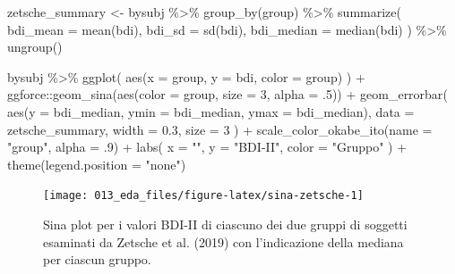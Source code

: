 \documentclass[
  10pt,
  italian,
  a4paper,
  extrafontsizes,onecolumn,openright
  ]{memoir}
\newenvironment{Shaded}{\begin{snugshade}}{\end{snugshade}}
\newcommand{\AttributeTok}[1]{\textcolor[rgb]{0.77,0.63,0.00}{#1}}
\newcommand{\DecValTok}[1]{\textcolor[rgb]{0.00,0.00,0.81}{#1}}
\newcommand{\FloatTok}[1]{\textcolor[rgb]{0.00,0.00,0.81}{#1}}
\newcommand{\FunctionTok}[1]{\textcolor[rgb]{0.00,0.00,0.00}{#1}}
\newcommand{\NormalTok}[1]{#1}
\newcommand{\OtherTok}[1]{\textcolor[rgb]{0.56,0.35,0.01}{#1}}
\newcommand{\SpecialCharTok}[1]{\textcolor[rgb]{0.00,0.00,0.00}{#1}}
\newcommand{\StringTok}[1]{\textcolor[rgb]{0.31,0.60,0.02}{#1}}
\theoremstyle{definition}
\theoremstyle{definition}
\theoremstyle{definition}
\theoremstyle{definition}
\theoremstyle{remark}
\begin{document}
\begin{Shaded}
\begin{Highlighting}[]
\NormalTok{zetsche\_summary }\OtherTok{\textless{}{-}}\NormalTok{ bysubj }\SpecialCharTok{\%\textgreater{}\%}
  \FunctionTok{group\_by}\NormalTok{(group) }\SpecialCharTok{\%\textgreater{}\%}
  \FunctionTok{summarize}\NormalTok{(}
    \AttributeTok{bdi\_mean =} \FunctionTok{mean}\NormalTok{(bdi),}
    \AttributeTok{bdi\_sd =} \FunctionTok{sd}\NormalTok{(bdi),}
    \AttributeTok{bdi\_median =} \FunctionTok{median}\NormalTok{(bdi)}
\NormalTok{  ) }\SpecialCharTok{\%\textgreater{}\%} 
  \FunctionTok{ungroup}\NormalTok{()}

\NormalTok{bysubj }\SpecialCharTok{\%\textgreater{}\%}
  \FunctionTok{ggplot}\NormalTok{(}
    \FunctionTok{aes}\NormalTok{(}\AttributeTok{x =}\NormalTok{ group, }\AttributeTok{y =}\NormalTok{ bdi, }\AttributeTok{color =}\NormalTok{ group)}
\NormalTok{  ) }\SpecialCharTok{+}
\NormalTok{  ggforce}\SpecialCharTok{::}\FunctionTok{geom\_sina}\NormalTok{(}\FunctionTok{aes}\NormalTok{(}\AttributeTok{color =}\NormalTok{ group, }\AttributeTok{size =} \DecValTok{3}\NormalTok{, }\AttributeTok{alpha =}\NormalTok{ .}\DecValTok{5}\NormalTok{)) }\SpecialCharTok{+}
  \FunctionTok{geom\_errorbar}\NormalTok{(}
    \FunctionTok{aes}\NormalTok{(}\AttributeTok{y =}\NormalTok{ bdi\_median, }\AttributeTok{ymin =}\NormalTok{ bdi\_median, }\AttributeTok{ymax =}\NormalTok{ bdi\_median),}
    \AttributeTok{data =}\NormalTok{ zetsche\_summary, }\AttributeTok{width =} \FloatTok{0.3}\NormalTok{, }\AttributeTok{size =} \DecValTok{3}
\NormalTok{  ) }\SpecialCharTok{+}
  \FunctionTok{scale\_color\_okabe\_ito}\NormalTok{(}\AttributeTok{name =} \StringTok{"group"}\NormalTok{, }\AttributeTok{alpha =}\NormalTok{ .}\DecValTok{9}\NormalTok{) }\SpecialCharTok{+}
  \FunctionTok{labs}\NormalTok{(}
    \AttributeTok{x =} \StringTok{""}\NormalTok{,}
    \AttributeTok{y =} \StringTok{"BDI{-}II"}\NormalTok{,}
    \AttributeTok{color =} \StringTok{"Gruppo"}
\NormalTok{  ) }\SpecialCharTok{+}
  \FunctionTok{theme}\NormalTok{(}\AttributeTok{legend.position =} \StringTok{"none"}\NormalTok{)}
\end{Highlighting}
\end{Shaded}

\begin{figure}[h]

{\centering \texttt{[image: 013\_eda\_files/figure-latex/sina-zetsche-1]} 

}

\caption{Sina plot per i valori BDI-II di ciascuno dei due gruppi di soggetti esaminati da Zetsche et al. (2019) con l'indicazione della mediana per ciascun gruppo.}\label{fig:sina-zetsche}
\end{figure}
\end{document}
